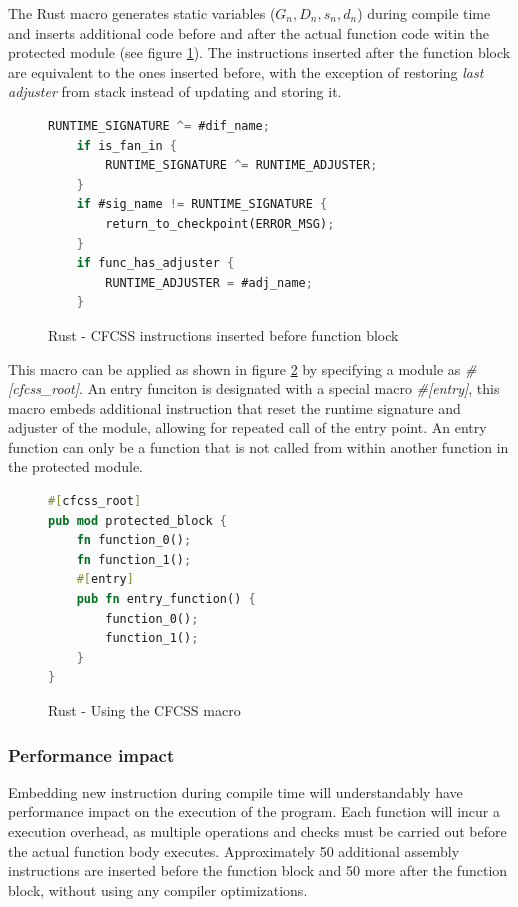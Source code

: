 \documentclass[12pt, letterpaper]{article}
\begin{document}
The Rust macro generates static variables ({$G_n, D_n, s_n, d_n$}) during compile time and inserts additional code before and after the actual function code witin the protected module (see figure \ref{fig:rust_cfcss_macro}). The instructions inserted after the function block are equivalent to the ones inserted before, with the exception of restoring \textit{last adjuster} from stack instead of updating and storing it.

\begin{figure}[!h]
    \begin{lstlisting}[language=Rust]
    RUNTIME_SIGNATURE ^= #dif_name;
    if is_fan_in {
        RUNTIME_SIGNATURE ^= RUNTIME_ADJUSTER;
    }
    if #sig_name != RUNTIME_SIGNATURE {
        return_to_checkpoint(ERROR_MSG);
    }
    if func_has_adjuster {
        RUNTIME_ADJUSTER = #adj_name;
    }
    \end{lstlisting}
    \caption{Rust - CFCSS instructions inserted before function block}
    \label{fig:rust_cfcss_macro}
    \end{figure}

This macro can be applied as shown in figure \ref{fig:rust_cfcss_macro_example} by specifying a module as \textit{\#[cfcss\_root]}. An entry funciton is designated with a special macro \textit{\#[entry]}, this macro embeds additional instruction that reset the runtime signature and adjuster of the module, allowing for repeated call of the entry point. An entry function can only be a function that is not called from within another function in the protected module.

\begin{figure}[!h]
\begin{lstlisting}[language=Rust]
#[cfcss_root]
pub mod protected_block {
    fn function_0();
    fn function_1();
    #[entry]
    pub fn entry_function() {
        function_0();
        function_1();
    }
}
\end{lstlisting}
\caption{Rust - Using the CFCSS macro}
\label{fig:rust_cfcss_macro_example}
\end{figure}

\subsubsection{Performance impact}

Embedding new instruction during compile time will understandably have performance impact on the execution of the program. Each function will incur a execution overhead, as multiple operations and checks must be carried out before the actual function body executes. Approximately 50 additional assembly instructions are inserted before the function block and 50 more after the function block, without using any compiler optimizations.
\end{document}
